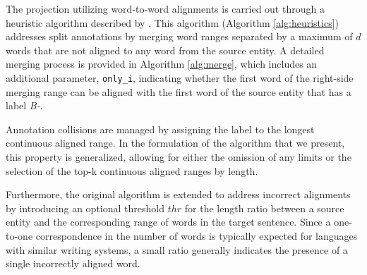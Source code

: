 The projection utilizing word-to-word alignments is carried out through a heuristic algorithm described
by \cite{garcia-ferrero-etal-2022-model}. This algorithm (Algorithm \ref{alg:heuristics}) addresses
split annotations by merging word ranges separated by a maximum of \( d \) words that are not aligned
to any word from the source entity. A detailed merging process is provided in Algorithm \ref{alg:merge},
which includes an additional parameter, \texttt{only\_i}, indicating whether the first word of the
right-side merging range can be aligned with the first word of the source entity that has a label
\textit{B-}.

Annotation collisions are managed by assigning the label to the longest continuous aligned range.
In the formulation of the algorithm that we present, this property is generalized, allowing for either the omission of
any limits or the selection of the top-k continuous aligned ranges by length.

Furthermore, the original algorithm is extended to address incorrect alignments by introducing an
optional threshold \( thr \) for the length ratio between a source entity and the corresponding range of words
in the target sentence. Since a one-to-one correspondence in the number of words is typically expected
for languages with similar writing systems, a small ratio generally indicates the presence of a single
incorrectly aligned word.

